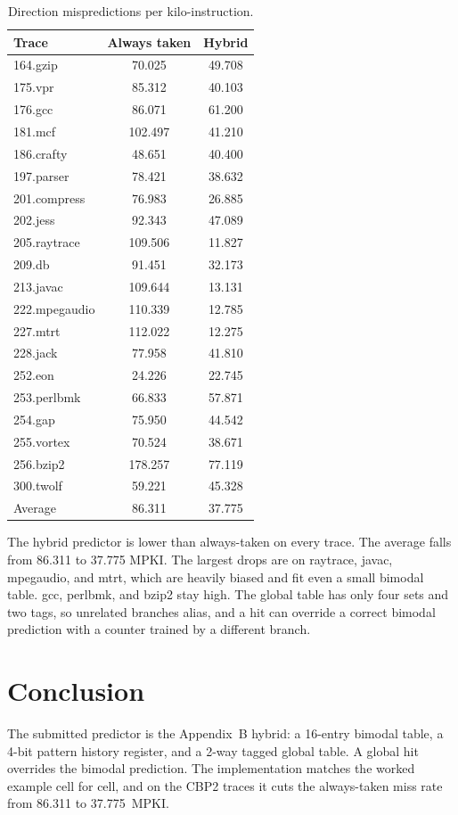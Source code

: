 \documentclass[11pt]{article}
\begin{document}
\begin{table}[ht]
\centering
\begin{tabular}{l S[table-format=3.3] S[table-format=2.3]}
\toprule
{Trace} & {Always taken} & {Hybrid} \\
\midrule
164.gzip      & 70.025 & 49.708 \\
175.vpr       & 85.312 & 40.103 \\
176.gcc       & 86.071 & 61.200 \\
181.mcf       & 102.497 & 41.210 \\
186.crafty    & 48.651 & 40.400 \\
197.parser    & 78.421 & 38.632 \\
201.compress  & 76.983 & 26.885 \\
202.jess      & 92.343 & 47.089 \\
205.raytrace  & 109.506 & 11.827 \\
209.db        & 91.451 & 32.173 \\
213.javac     & 109.644 & 13.131 \\
222.mpegaudio & 110.339 & 12.785 \\
227.mtrt      & 112.022 & 12.275 \\
228.jack      & 77.958 & 41.810 \\
252.eon       & 24.226 & 22.745 \\
253.perlbmk   & 66.833 & 57.871 \\
254.gap       & 75.950 & 44.542 \\
255.vortex    & 70.524 & 38.671 \\
256.bzip2     & 178.257 & 77.119 \\
300.twolf     & 59.221 & 45.328 \\
\midrule
{Average}     & 86.311 & 37.775 \\
\bottomrule
\end{tabular}
\caption{Direction mispredictions per kilo-instruction.}
\end{table}

The hybrid predictor is lower than always-taken on every trace. The average
falls from 86.311 to 37.775 MPKI. The largest drops are on raytrace, javac,
mpegaudio, and mtrt, which are heavily biased and fit even a small bimodal
table. gcc, perlbmk, and bzip2 stay high. The global table has only four sets
and two tags, so unrelated branches alias, and a hit can override a correct
bimodal prediction with a counter trained by a different branch.

\section{Conclusion}

The submitted predictor is the Appendix~B hybrid: a 16-entry bimodal table, a
4-bit pattern history register, and a 2-way tagged global table. A global hit
overrides the bimodal prediction. The implementation matches the worked
example cell for cell, and on the CBP2 traces it cuts the always-taken miss
rate from 86.311 to 37.775~MPKI.
\end{document}

